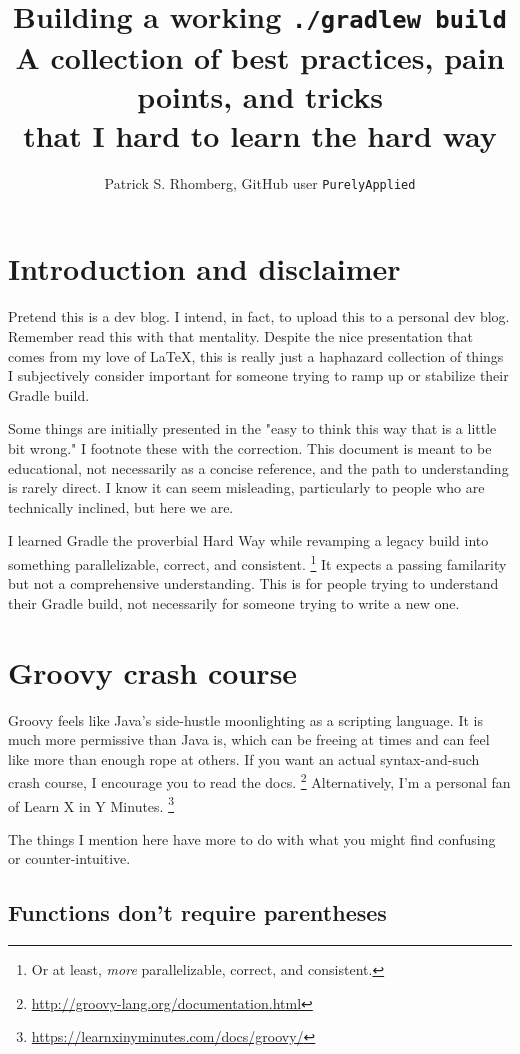 \documentclass[]{article}
\title{Building a working \texttt{./gradlew build}  \large \\
  A collection of best practices, pain points, and tricks \\
  that I hard to learn the hard way}
\author{Patrick S. Rhomberg, GitHub user \texttt{PurelyApplied}}
\theoremstyle{definition}
\begin{document}
\maketitle
\tableofcontents


\section{Introduction and disclaimer}

Pretend this is a dev blog.
I intend, in fact, to upload this to a personal dev blog.
Remember read this with that mentality.
Despite the nice presentation that comes from my love of \LaTeX, 
this is really just a haphazard collection of things I subjectively consider important for someone trying to ramp up or stabilize their Gradle build.

Some things are initially presented in the "easy to think this way that is a little bit wrong."
I footnote these with the correction.
This document is meant to be educational, not necessarily as a concise reference, and the path to understanding is rarely direct.
I know it can seem misleading, particularly to people who are technically inclined, but here we are.

I learned Gradle the proverbial Hard Way while revamping a legacy build into something parallelizable, correct, and consistent.%
\footnote{Or at least, \emph{more} parallelizable, correct, and consistent.}
It expects a passing familarity but not a comprehensive understanding.
This is for people trying to understand their Gradle build,
  not necessarily for someone trying to write a new one.


\section{Groovy crash course}

Groovy feels like Java's side-hustle moonlighting as a scripting language.
It is much more permissive than Java is,
  which can be freeing at times and can feel like more than enough rope at others.
If you want an actual syntax-and-such crash course, I encourage you to read the docs.%
\footnote{\url{http://groovy-lang.org/documentation.html}}
Alternatively, I'm a personal fan of Learn X in Y Minutes.%
\footnote{\url{https://learnxinyminutes.com/docs/groovy/}}

The things I mention here have more to do with what you might find confusing or counter-intuitive.

\subsection{Functions don't require parentheses}
\end{document}

